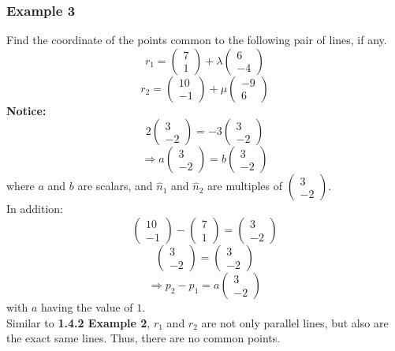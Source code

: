 \documentclass[hidelinks, a4paper, 12pt]{article}
\newcommand{\bd}{\textbf}
\newcommand{\thus}{\Rightarrow}
\newcommand{\nhat}{\hat{n}}
\newcommand{\n}{\\[\baselineskip]}
\begin{document}
            \subsubsection{Example 3}
                Find the coordinate of the points common to the following pair of lines, if any.
                \[r_1 = \begin{pmatrix} 7 \\ 1 \end{pmatrix} + \lambda \begin{pmatrix} 6 \\ -4 \end{pmatrix}\]
                \[r_2 = \begin{pmatrix} 10 \\ -1 \end{pmatrix} + \mu \begin{pmatrix} -9 \\ 6 \end{pmatrix}\]
                \bd{Notice: }
                \[2\begin{pmatrix} 3 \\ -2 \end{pmatrix} = -3 \begin{pmatrix} 3 \\ -2 \end{pmatrix}\]
                \[\thus a\begin{pmatrix} 3 \\ -2 \end{pmatrix} = b \begin{pmatrix} 3 \\ -2 \end{pmatrix}\]
                where $a$ and $b$ are scalars, and $\nhat_1$ and $\nhat_2$ are multiples of $\begin{pmatrix} 3 \\ -2 \end{pmatrix}$.\n
                In addition:
                \[\begin{pmatrix} 10 \\ -1 \end{pmatrix} - \begin{pmatrix} 7 \\ 1 \end{pmatrix} = \begin{pmatrix} 3 \\ -2 \end{pmatrix}\]
                \[\begin{pmatrix} 3 \\ -2 \end{pmatrix} = \begin{pmatrix} 3 \\ -2 \end{pmatrix}\]
                \[\thus p_2 - p_1 = a\begin{pmatrix} 3 \\ -2 \end{pmatrix}\]
                with $a$ having the value of $1$.\n
                Similar to \bd{1.4.2 Example 2}, $r_1$ and $r_2$ are not only parallel lines, but also are the exact same lines. Thus, there are
                no common points.
    
\end{document}
